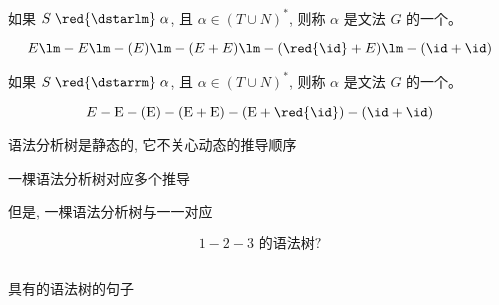 \begin{frame}{}
  \begin{definition}
    如果 $S \;\red{\dstarlm}\; \alpha$, 且 $\alpha \in (T \cup N)^{\ast}$,
    则称 $\alpha$ 是文法 $G$ 的一个。 
  \end{definition}

  \[
    E \lm -E \lm -(E) \lm -(E + E) \lm -(\red{\id} + E) \lm -(\id + \id)
  \]

  \begin{definition}
    如果 $S \;\red{\dstarrm}\; \alpha$, 且 $\alpha \in (T \cup N)^{\ast}$,
    则称 $\alpha$ 是文法 $G$ 的一个。 
  \end{definition}

  \[
    E \rm -E \rm -(E) \rm -(E + E) \rm -(E + \red{\id}) \rm -(\id + \id)
  \]
\end{frame}

\begin{frame}{}
  \begin{center}

    \vspace{0.30cm}
    语法分析树是静态的, 它不关心动态的推导顺序


    一棵语法分析树对应多个推导

    \pause
    \vspace{0.30cm}
    但是, 一棵语法分析树与一一对应
  \end{center}
\end{frame}

\begin{frame}{}
  

  \[
    1 - 2 - 3 \text{ 的语法树?}
  \]

  \pause
  \begin{columns}
      \pause
  \end{columns}

  \pause
  \vspace{0.60cm}
  \begin{center}
     具有的语法树的句子
  \end{center}
\end{frame}

